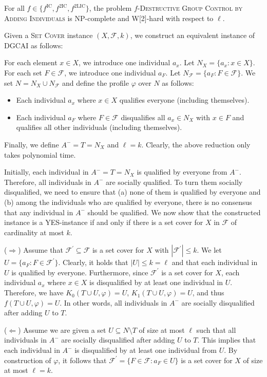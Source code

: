 \documentclass[
    12pt,               %
    a4paper,            %
    bibtotoc,           %
    pointlessnumbers,   %
    ngerman,            %
    titlepage,          %
    leqno,              %
    ]{scrarticle}       %
\begin{document}
\begin{Theorem} \label{thm:ic_dgcai_npc}
For all $f \in \{ f^{\text{IC}}, f^{\text{2IC}}, f^{\text{2LIC}} \}$, the problem $f$-\textsc{Destructive Group Control by Adding Individuals} is NP-complete and W[2]-hard with respect to $\ell$.
\end{Theorem}

\begin{Proof}
Given a \textsc{Set Cover} instance $(X, \mathcal{F}, k)$, we construct an equivalent instance of DGCAI as follows:

For each element $x \in X$, we introduce one individual $a_x$. Let $N_X = \{ a_x : x \in X \}$. For each set $F \in \mathcal{F}$, we introduce one individual $a_F$. Let $N_\mathcal{F} = \{ a_F : F \in \mathcal{F} \}$. We set $N = N_X \cup N_\mathcal{F}$ and define the profile $\varphi$ over $N$ as follows:

\begin{itemize}[nolistsep]
\item
Each individual $a_x$ where $x \in X$ qualifies everyone (including themselves).
\item
Each individual $a_F$ where $F \in \mathcal{F}$ disqualifies all $a_x \in N_X$ with $x \in F$ and qualifies all other individuals (including themselves).
\end{itemize}

Finally, we define $A^- = T = N_X$ and $\ell = k$. Clearly, the above reduction only takes polynomial time.

Initially, each individual in $A^- = T = N_X$ is qualified by everyone from $A^-$. Therefore, all individuals in $A^-$ are socially qualified. To turn them socially disqualified, we need to ensure that (a) none of them is qualified by everyone and (b) among the individuals who are qualified by everyone, there is no consensus that any individual in $A^-$ should be qualified. We now show that the constructed instance is a YES-instance if and only if there is a set cover for $X$ in $\mathcal{F}$ of cardinality at most $k$.

($\Rightarrow$) Assume that $\mathcal{F}^\prime \subseteq \mathcal{F}$ is a set cover for $X$ with $|\mathcal{F}^\prime| \leq k$. We let $U = \{ a_F : F \in \mathcal{F}^\prime \}$. Clearly, it holds that $|U| \leq k = \ell$ and that each individual in $U$ is qualified by everyone. Furthermore, since $\mathcal{F}^\prime$ is a set cover for $X$, each individual $a_x$ where $x \in X$ is disqualified by at least one individual in $U$. Therefore, we have $K_0(T \cup U, \varphi) = U$, $K_1(T \cup U, \varphi) = U$, and thus $f(T \cup U, \varphi) = U$. In other words, all individuals in $A^-$ are socially disqualified after adding $U$ to $T$.

($\Leftarrow$) Assume we are given a set $U \subseteq N \setminus T$ of size at most $\ell$ such that all individuals in $A^-$ are socially disqualified after adding $U$ to $T$. This implies that each individual in $A^-$ is disqualified by at least one individual from $U$. By construction of $\varphi$, it follows that $\mathcal{F}^\prime = \{ F \in \mathcal{F} : a_F \in U \}$ is a set cover for $X$ of size at most $\ell = k$.
\end{Proof}
\end{document}
